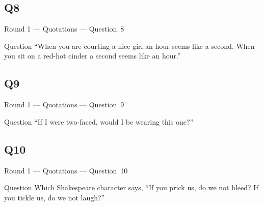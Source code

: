 \documentclass[11pt]{beamer}
\begin{document}
\subsection*{Q8}
\begin{frame}[t]{Round 1 --- Quotations --- \mbox{Question 8}}
\vspace{-0.5em}
\begin{block}{Question}
``When you are courting a nice girl an hour seems like a second. When you sit on a red-hot cinder a second seems like an hour.''
\end{block}
\end{frame}
\subsection*{Q9}
\begin{frame}[t]{Round 1 --- Quotations --- \mbox{Question 9}}
\vspace{-0.5em}
\begin{block}{Question}
``If I were two-faced, would I be wearing this one?''
\end{block}
\end{frame}
\subsection*{Q10}
\begin{frame}[t]{Round 1 --- Quotations --- \mbox{Question 10}}
\vspace{-0.5em}
\begin{block}{Question}
Which Shakespeare character says, ``If you prick us, do we not bleed? If you tickle us, do we not laugh?''
\end{block}
\end{frame}
\end{document}
